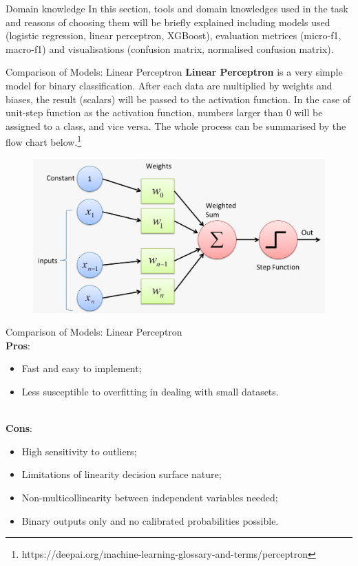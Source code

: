 \begin{frame}{Domain knowledge}
In this section, tools and domain knowledges used in the task and reasons of choosing them  will be briefly explained including models used (logistic regression, linear perceptron, XGBoost), evaluation metrices 
(micro-f1, macro-f1) and visualisations (confusion matrix, normalised confusion matrix).
\end{frame}


\begin{frame} {Comparison of Models: Linear Perceptron}
\textbf{Linear Perceptron} is a very simple model for binary classification. After each data are multiplied by weights and biases, the result (scalars) will be passed to the activation function. In the case of unit-step function as the activation function, numbers larger than 0 will be assigned to a class, and vice versa. The whole process can be summarised by the flow chart below.\footnote{https://deepai.org/machine-learning-glossary-and-terms/perceptron}
\begin{figure}[H]
    \centering
    \includegraphics[width=0.7\linewidth]{presentation/images/illustrate/linearp.jpeg}
\end{figure}
\end{frame}

\begin{frame} {Comparison of Models: Linear Perceptron}
\\ \textbf{Pros}:
\begin{itemize}
\item Fast and easy to implement; 
\item Less susceptible to overfitting in dealing with small datasets.
\end{itemize}
\\ \textbf{Cons}:
\begin{itemize}
\item High sensitivity to outliers; 
\item Limitations of linearity decision surface nature; 
\item Non-multicollinearity between independent variables needed;
\item Binary outputs only and no calibrated probabilities possible.
\end{itemize}
\end{frame}


